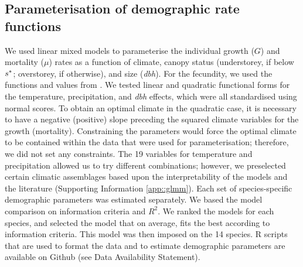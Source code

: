 \subsection{Parameterisation of demographic rate functions}
We used linear mixed models to parameterise the individual growth ($ G $) and mortality ($ \mu $) rates as a function of climate, canopy status (understorey, if below $ {s}^{*} $; overstorey, if otherwise), and size (\textit{dbh}). For the fecundity, we used the functions and values from \citet{Purves2008}. We tested linear and quadratic functional forms for the temperature, precipitation, and \textit{dbh} effects, which were all standardised using normal scores. To obtain an optimal climate in the quadratic case, it is necessary to have a negative (positive) slope preceding the squared climate variables for the growth (mortality). Constraining the parameters would force the optimal climate to be contained within the data that were used for parameterisation; therefore, we did not set any constraints. The 19 variables for temperature and precipitation allowed us to try different combinations; however, we preselected certain climatic assemblages based upon the interpretability of the models and the literature (Supporting Information \ref{app::glmm}). Each set of species-specific demographic parameters was estimated separately. We based the model comparison on information criteria and $ R^2 $. We ranked the models for each species, and selected the model that on average, fits the best according to information criteria. This model was then imposed on the 14 species. R scripts that are used to format the data and to estimate demographic parameters are available on Github (see Data Availability Statement). 

